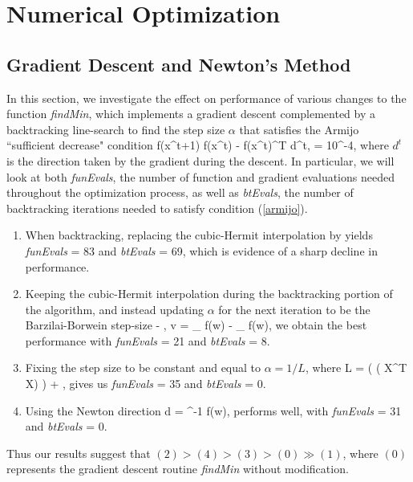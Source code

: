 \section{Numerical Optimization}

\subsection{Gradient Descent and Newton's Method}
\label{sec:Q3.1}

In this section, we investigate the effect on performance of various changes to the function \textit{findMin}, which implements a gradient descent complemented by a backtracking line-search to find the step size $\alpha$ that satisfies the Armijo ``sufficient decrease" condition
\be f(x^{t+1}) \leq f(x^t) - \gamma \alpha \nabla f(x^t)^T d^t, \;\;\;\; \gamma = 10^{-4}, \label{armijo} \ee
where $d^t$ is the direction taken by the gradient during the descent. In particular, we will look at both \textit{funEvals}, the number of function and gradient evaluations needed throughout the optimization process, as well as \textit{btEvals}, the number of backtracking iterations needed to satisfy condition (\ref{armijo}).

\begin{enumerate}
\item When backtracking, replacing the cubic-Hermit interpolation by 
\be \alpha \leftarrow {} \ee  
yields \textit{funEvals} = 83 and \textit{btEvals} = 69, which is evidence of a sharp decline in performance.
\item Keeping the cubic-Hermit interpolation during the backtracking portion of the algorithm, and instead updating $\alpha$ for the next iteration to be the Barzilai-Borwein step-size
\be \alpha \leftarrow - \alpha {}, \;\;\;\;\; v = \nabla_ f(w) - \nabla_ f(w), \ee
we obtain the best performance with \textit{funEvals} = 21 and \textit{btEvals} = 8.
\item Fixing the step size to be constant and equal to $\alpha = 1/L$, where 
\be L =  \max \left(  ( X^T X) \right) + \lambda, \ee
gives us \textit{funEvals} = 35 and \textit{btEvals} = 0.
\item Using the Newton direction 
\be d = ^{-1} \nabla f(w), \ee
performs well, with \textit{funEvals} = 31 and \textit{btEvals} = 0.
\end{enumerate}
Thus our results suggest that $(2) > (4) > (3) > (0) \gg (1)$, where $(0)$ represents the gradient descent routine \textit{findMin} without modification.
  

